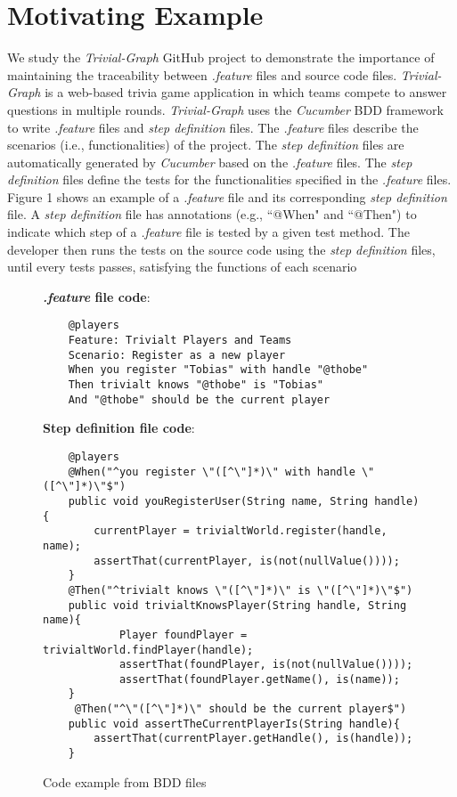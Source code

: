 \section{Motivating Example}
We study the \textit{Trivial-Graph} \cite{akollegger_2011} GitHub project to demonstrate the importance of maintaining the traceability between \textit{.feature} files and source code files. \textit{Trivial-Graph} is a web-based trivia game application in which teams compete to answer questions in multiple rounds. \textit{Trivial-Graph} uses the \textit{Cucumber} BDD framework \cite{akollegger_2011, BDDFrame} to write \textit{.feature} files and \textit{step definition} files. The \textit{.feature} files describe the scenarios (i.e., functionalities) of the project. The \textit{step definition} files are automatically generated by \textit{Cucumber} based on the \textit{.feature} files. The \textit{step definition} files define the tests for the functionalities specified in the \textit{.feature} files. 
Figure 1 shows an example of a \textit{.feature} file and its corresponding \textit{step definition} file. A \textit{step definition} file has annotations (e.g., ``@When" and ``@Then") to indicate which step of a \textit{.feature} file is tested by a given test method. The developer then runs the tests on the source code using the \textit{step definition} files, until every tests passes, satisfying the functions of each scenario

\begin{figure}
	\textbf{\textit{.feature} file code}:
	\begin{lstlisting}
	@players
	Feature: Trivialt Players and Teams
	Scenario: Register as a new player
	When you register "Tobias" with handle "@thobe"
	Then trivialt knows "@thobe" is "Tobias"
	And "@thobe" should be the current player
	\end{lstlisting}
	\textbf{Step definition file code}:
	\begin{lstlisting}
	@players
	@When("^you register \"([^\"]*)\" with handle \"([^\"]*)\"$")
	public void youRegisterUser(String name, String handle){
		currentPlayer = trivialtWorld.register(handle, name);
		assertThat(currentPlayer, is(not(nullValue())));
	}
	@Then("^trivialt knows \"([^\"]*)\" is \"([^\"]*)\"$")
	public void trivialtKnowsPlayer(String handle, String name){
	        Player foundPlayer = trivialtWorld.findPlayer(handle);
			assertThat(foundPlayer, is(not(nullValue())));
			assertThat(foundPlayer.getName(), is(name));
	}
	 @Then("^\"([^\"]*)\" should be the current player$")
	public void assertTheCurrentPlayerIs(String handle){
		assertThat(currentPlayer.getHandle(), is(handle));
	}
	\end{lstlisting}
	\caption{Code example from BDD files}
	
\end{figure}

